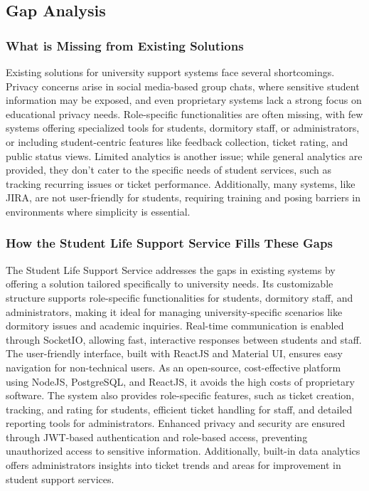 		
\subsection{Gap Analysis}

	\subsubsection{What is Missing from Existing Solutions}
	Existing solutions for university support systems face several shortcomings. Privacy concerns arise in social media-based group chats, where sensitive student information may be exposed, and even proprietary systems lack a strong focus on educational privacy needs. Role-specific functionalities are often missing, with few systems offering specialized tools for students, dormitory staff, or administrators, or including student-centric features like feedback collection, ticket rating, and public status views. Limited analytics is another issue; while general analytics are provided, they don’t cater to the specific needs of student services, such as tracking recurring issues or ticket performance. Additionally, many systems, like JIRA, are not user-friendly for students, requiring training and posing barriers in environments where simplicity is essential.
	
	\subsubsection{How the Student Life Support Service Fills These Gaps}
	The Student Life Support Service addresses the gaps in existing systems by offering a solution tailored specifically to university needs. Its customizable structure supports role-specific functionalities for students, dormitory staff, and administrators, making it ideal for managing university-specific scenarios like dormitory issues and academic inquiries. Real-time communication is enabled through SocketIO, allowing fast, interactive responses between students and staff. The user-friendly interface, built with ReactJS and Material UI, ensures easy navigation for non-technical users. As an open-source, cost-effective platform using NodeJS, PostgreSQL, and ReactJS, it avoids the high costs of proprietary software. The system also provides role-specific features, such as ticket creation, tracking, and rating for students, efficient ticket handling for staff, and detailed reporting tools for administrators. Enhanced privacy and security are ensured through JWT-based authentication and role-based access, preventing unauthorized access to sensitive information. Additionally, built-in data analytics offers administrators insights into ticket trends and areas for improvement in student support services.
	
	
	
	
	
			